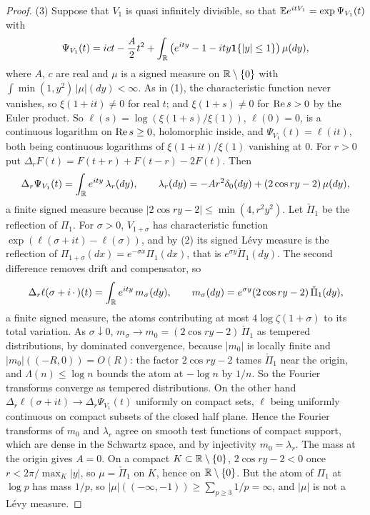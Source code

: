 \begin{proof}
(3) Suppose that $V_1$ is quasi infinitely divisible, so that $\mathbb{E} e^{itV_1}=\exp\Psi_{V_1}(t)$ with
\[
\Psi_{V_1}(t)=ict-\frac A2t^2+\int_{\mathbb{R}}\big(e^{ity}-1-ity\mathbf 1\{|y|\le1\}\big)\,\mu(dy),
\]
where $A$, $c$ are real and $\mu$ is a signed measure on $\mathbb{R}\setminus\{0\}$ with $\int\min(1,y^2)\,|\mu|(dy)<\infty$. As in (1), the characteristic function never vanishes, so $\xi(1+it)\ne0$ for real $t$; and $\xi(1+s)\ne0$ for $\operatorname{Re} s>0$ by the Euler product. So $\ell(s)=\log(\xi(1+s)/\xi(1))$, $\ell(0)=0$, is a continuous logarithm on $\operatorname{Re} s\ge0$, holomorphic inside, and $\Psi_{V_1}(t)=\ell(it)$, both being continuous logarithms of $\xi(1+it)/\xi(1)$ vanishing at $0$. For $r>0$ put $\Delta_rF(t)=F(t+r)+F(t-r)-2F(t)$. Then
\[
\Delta_r\Psi_{V_1}(t)=\int_{\mathbb{R}}e^{ity}\,\lambda_r(dy),\qquad \lambda_r(dy)=-Ar^2\delta_0(dy)+(2\cos ry-2)\,\mu(dy),
\]
a finite signed measure because $|2\cos ry-2|\le\min(4,r^2y^2)$. Let $\check\Pi_1$ be the reflection of $\Pi_1$. For $\sigma>0$, $V_{1+\sigma}$ has characteristic function $\exp(\ell(\sigma+it)-\ell(\sigma))$, and by (2) its signed L\'evy measure is the reflection of $\Pi_{1+\sigma}(dx)=e^{-\sigma x}\Pi_1(dx)$, that is $e^{\sigma y}\check\Pi_1(dy)$. The second difference removes drift and compensator, so
\[
\Delta_r\ell(\sigma+i\,\cdot\,)(t)=\int_{\mathbb{R}}e^{ity}\,m_\sigma(dy),\qquad m_\sigma(dy)=e^{\sigma y}(2\cos ry-2)\,\check\Pi_1(dy),
\]
a finite signed measure, the atoms contributing at most $4\log\zeta(1+\sigma)$ to its total variation. As $\sigma\downarrow0$, $m_\sigma\to m_0=(2\cos ry-2)\,\check\Pi_1$ as tempered distributions, by dominated convergence, because $|m_0|$ is locally finite and $|m_0|((-R,0))=O(R)$: the factor $2\cos ry-2$ tames $\check\Pi_1$ near the origin, and $\Lambda(n)\le\log n$ bounds the atom at $-\log n$ by $1/n$. So the Fourier transforms converge as tempered distributions. On the other hand $\Delta_r\ell(\sigma+it)\to\Delta_r\Psi_{V_1}(t)$ uniformly on compact sets, $\ell$ being uniformly continuous on compact subsets of the closed half plane. Hence the Fourier transforms of $m_0$ and $\lambda_r$ agree on smooth test functions of compact support, which are dense in the Schwartz space, and by injectivity $m_0=\lambda_r$. The mass at the origin gives $A=0$. On a compact $K\subset\mathbb{R}\setminus\{0\}$, $2\cos ry-2<0$ once $r<2\pi/\max_K|y|$, so $\mu=\check\Pi_1$ on $K$, hence on $\mathbb{R}\setminus\{0\}$. But the atom of $\Pi_1$ at $\log p$ has mass $1/p$, so $|\mu|((-\infty,-1))\ge\sum_{p\ge3}1/p=\infty$, and $|\mu|$ is not a L\'evy measure.
\end{proof}


